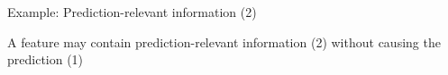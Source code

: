 \documentclass[11pt,compress,t,notes=noshow, aspectratio=169, xcolor=table]{beamer}
\begin{document}
\begin{frame}{Example: Prediction-relevant information (2)}

  A feature may contain prediction-relevant information (2) without causing the prediction (1)
\begin{columns}[T, totalwidth=\textwidth]
  \begin{column}{0.52\textwidth}
		
		

\end{column}
\end{columns}
\end{frame}
\end{document}

